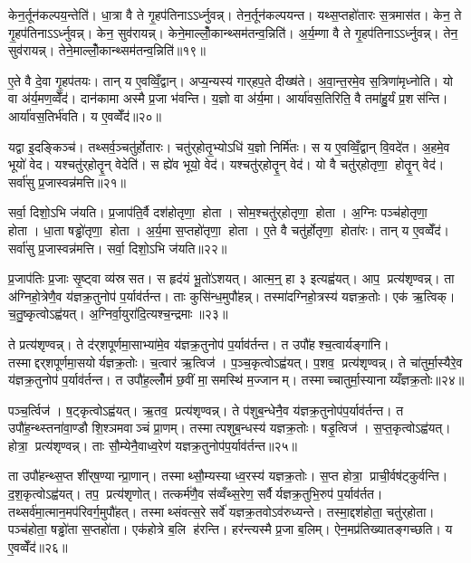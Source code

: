 केन॒र्तून॑कल्पय॒न्तेति॑। धा॒त्रा वै ते गृ॒हप॑तिनाऽऽर्ध्नुवन्न्। तेन॒र्तून॑कल्पयन्त। यथ्स॒प्तहो॑तारः स॒त्रमास॑त। केन॒ ते गृ॒हप॑तिनाऽऽर्ध्नुवन्न्। केन॒ सुव॑रायन्न्। केने॒माल्लोँ॒कान्थ्सम॑तन्व॒न्निति॑। अ॒र्य॒म्णा वै ते गृ॒हप॑तिनाऽऽर्ध्नुवन्न्। तेन॒ सुव॑रायन्न्। तेने॒माल्लोँ॒कान्थ्सम॑तन्व॒न्निति॑॥१९॥

ए॒ते वै दे॒वा गृ॒हप॑तयः। तान् य ए॒वव्विँ॒द्वान्। अप्य॒न्यस्य॑ गार्‌हप॒ते दीख्ष॑ते। अ॒वा॒न्त॒रमे॒व स॒त्रिणा॑मृध्नोति। यो वा अ॑र्य॒मण॒व्वेँद॑। दान॑कामा अस्मै प्र॒जा भ॑वन्ति। य॒ज्ञो वा अ॑र्य॒मा। आर्या॑वस॒तिरिति॒ वै तमा॑हु॒र्यं प्र॒शस॑न्ति। आर्या॑वस॒तिर्भ॑वति। य ए॒वव्वेँद॑॥२०॥

यद्वा इ॒दङ्किञ्च॑। तथ्सर्व॒ञ्चतु॑र्\mbox{}होतारः। चतु॑र्‌होतृ॒भ्योऽधि॑ य॒ज्ञो निर्मि॑तः। स य ए॒वव्विँ॒द्वान्‌ वि॒वदे॑त। अ॒हमे॒व भूयो॑ वेद। यश्चतु॑र्‌होतॄ॒न् वेदेति॑। स ह्ये॑व भूयो॒ वेद॑। यश्चतु॑र्‌होतॄ॒न् वेद॑। यो वै चतु॑र्‌होतृणा॒ होतॄ॒न् वेद॑। सर्वा॑सु प्र॒जास्वन्न॑मत्ति॥२१॥

सर्वा॒ दिशो॒ऽभि ज॑यति। प्र॒जाप॑ति॒र्वै दश॑होतृणा॒ होता। सोम॒श्चतु॑र्‌होतृणा॒ होता। अ॒ग्निः पञ्च॑होतृणा॒ होता। धा॒ता षड्ढो॑तृणा॒ होता। अ॒र्य॒मा स॒प्तहो॑तृणा॒ होता। ए॒ते वै चतु॑र्\mbox{}होतृणा॒ होता॑रः। तान् य ए॒वव्वेँद॑। सर्वा॑सु प्र॒जास्वन्न॑मत्ति। सर्वा॒ दिशो॒ऽभि ज॑यति॥२२॥\anuvakamend[आ॒र्ध्नु॒व॒न्ना॒र्ध्नु॒व॒न्नित्ये॒वव्वेँदात्ति सर्वा॒ दिशो॒ऽभि ज॑यति (वै तेन॑ स॒त्रङ्केन॑ ॥ )]

प्र॒जाप॑तिः प्र॒जाः सृ॒ष्ट्वा व्य॑स्रसत। स हृद॑यं भू॒तो॑ऽशयत्। आत्म॒न्॒ हा ३ इत्यह्व॑यत्। आप॒ प्रत्य॑शृण्वन्न्। ता अ॑ग्निहो॒त्रेणै॒व य॑ज्ञक्र॒तुनोप॑ प॒र्याव॑र्तन्त। ताः कुसि॑न्ध॒मुपौ॑हन्न्। तस्मा॑दग्निहो॒त्रस्य॑ यज्ञक्र॒तोः। एक॑ ऋ॒त्विक्। च॒तु॒ष्कृत्वोऽह्व॑यत्। अ॒ग्निर्वा॒युरा॑दि॒त्यश्च॒न्द्रमाः॥२३॥

ते प्रत्य॑शृण्वन्न्। ते द॑र्‌शपूर्णमा॒साभ्या॑मे॒व य॑ज्ञक्र॒तुनोप॑ प॒र्याव॑र्तन्त। त उपौ॑हश्च॒त्वार्यङ्गा॑नि। तस्माद्दर्‌शपूर्णमा॒सयोर्यज्ञक्र॒तोः। च॒त्वार॑ ऋ॒त्विज॑। प॒ञ्च॒कृत्वोऽह्व॑यत्। प॒शव॒ प्रत्य॑शृण्वन्न्। ते चा॑तुर्मा॒स्यैरे॒व य॑ज्ञक्र॒तुनोप॑ प॒र्याव॑र्तन्त। त उपौ॑ह॒ल्लोँम॑ छ॒वीं मा॒समस्थि॑ म॒ज्जानम्। तस्माच्चातुर्मा॒स्यानाय्यँज्ञक्र॒तोः॥२४॥

पञ्च॒र्त्विज॑। ष॒ट्कृत्वोऽह्व॑यत्। ऋ॒तव॒ प्रत्य॑शृण्वन्न्। ते प॑शुब॒न्धेनै॒व य॑ज्ञक्र॒तुनोप॑प॒र्याव॑र्तन्त। त उपौ॑ह॒न्थ्स्तना॑वा॒ण्डौ शि॒श्ञमवाञ्चं प्रा॒णम्। तस्मात्पशुब॒न्धस्य॑ यज्ञक्र॒तोः। षडृ॒त्विज॑। स॒प्त॒कृत्वोऽह्व॑यत्। होत्रा॒ प्रत्य॑शृण्वन्न्। ताः सौ॒म्येनै॒वाध्व॒रेण॑ यज्ञक्र॒तुनोप॑प॒र्याव॑र्तन्त॥२५॥

ता उपौ॑हन्थ्स॒प्त शी॑र्‌ष॒ण्यान्प्रा॒णान्। तस्माथ्सौ॒म्यस्याध्व॒रस्य॑ यज्ञक्र॒तोः। स॒प्त होत्रा॒ प्राची॒र्वष॑ट्कुर्वन्ति। द॒श॒कृत्वोऽह्व॑यत्। तप॒ प्रत्य॑शृणोत्। तत्कर्म॑णै॒व स॑व्वँथ्स॒रेण॒ सर्वैर्यज्ञक्र॒तुभि॒रुप॑ प॒र्याव॑र्तत। तथ्सर्व॑मा॒त्मान॒मप॑रिवर्ग॒मुपौ॑हत्। तस्माथ्संवत्स॒रे सर्वे॑ यज्ञक्र॒तवोऽव॑रुध्यन्ते। तस्मा॒द्दश॑होता॒ चतु॑र्‌होता। पञ्च॑होता॒ षड्ढो॑ता स॒प्तहो॑ता। एक॑होत्रे ब॒लि ह॑रन्ति। हर॑न्त्यस्मै प्र॒जा ब॒लिम्। ऐन॒मप्र॑तिख्यातङ्गच्छति। य ए॒वव्वेँद॑॥२६॥\anuvakamend[च॒न्द्रमाश्चातुर्मा॒स्यानाय्यँज्ञक्र॒तोर॑ध्व॒रेण॑ यज्ञक्र॒तुनोप॑ प॒र्याव॑र्तन्त स॒प्तहो॑ता च॒त्वारि॑ च]

